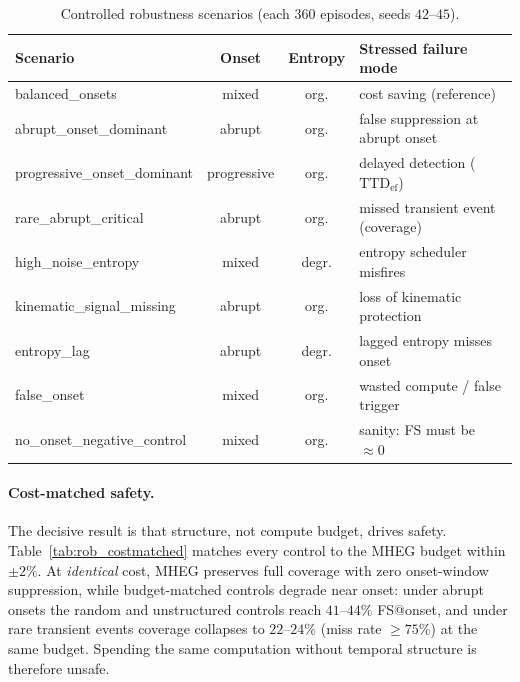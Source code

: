 \begin{table}[!tbp]
\centering
\caption{Controlled robustness scenarios (each $360$ episodes, seeds
$42$--$45$).}
\label{tab:rob_scenarios}
\scriptsize
\setlength{\tabcolsep}{4pt}
\renewcommand{\arraystretch}{1.15}
\begin{tabularx}{\columnwidth}{>{\raggedright\arraybackslash}l c c
  >{\raggedright\arraybackslash}X}
\toprule
\textbf{Scenario} & \textbf{Onset} & \textbf{Entropy} & \textbf{Stressed failure mode} \\
\midrule
balanced\_onsets            & mixed       & org.  & cost saving (reference) \\
\rowcolor{gray!8}
abrupt\_onset\_dominant      & abrupt      & org.  & false suppression at abrupt onset \\
progressive\_onset\_dominant & progressive & org.  & delayed detection ($\mathrm{TTD}_{\mathrm{ef}}$) \\
\rowcolor{gray!8}
rare\_abrupt\_critical       & abrupt      & org.  & missed transient event (coverage) \\
high\_noise\_entropy         & mixed       & degr. & entropy scheduler misfires \\
\rowcolor{gray!8}
kinematic\_signal\_missing   & abrupt      & org.  & loss of kinematic protection \\
entropy\_lag                & abrupt      & degr. & lagged entropy misses onset \\
\rowcolor{gray!8}
false\_onset                & mixed       & org.  & wasted compute / false trigger \\
no\_onset\_negative\_control & mixed       & org.  & sanity: FS must be $\approx 0$ \\
\bottomrule
\end{tabularx}
\end{table}

\paragraph{Cost-matched safety.}
The decisive result is that structure, not compute budget, drives safety.
Table~\ref{tab:rob_costmatched} matches every control to the \mbox{MHEG}
budget within $\pm 2\%$. At \emph{identical} cost, \mbox{MHEG} preserves full
coverage with zero onset-window suppression, while budget-matched controls
degrade near onset: under abrupt onsets the random and unstructured controls
reach $41$--$44\%$ FS@onset, and under rare transient events coverage
collapses to $22$--$24\%$ (miss rate $\ge 75\%$) at the same budget. Spending
the same computation without temporal structure is therefore unsafe.

